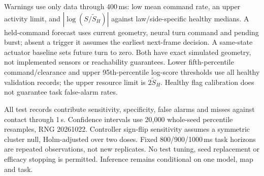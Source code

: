 Warnings use only data through 400\,ms: low mean command rate, an upper activity limit, and $|\log(S/\tilde S_H)|$ against law/side-specific healthy medians. A held-command forecast uses current geometry, neural turn command and pending burst; absent a trigger it assumes the earliest next-frame decision. A same-state actuator baseline sets future turn to zero. Both have exact simulated geometry, not implemented sensors or reachability guarantees. Lower fifth-percentile command/clearance and upper 95th-percentile log-score thresholds use all healthy validation records; the upper resource limit is $2\tilde S_H$. Healthy flag calibration does not guarantee task false-alarm rates.

All test records contribute sensitivity, specificity, false alarms and misses against contact through 1\,s. Confidence intervals use 20,000 whole-seed percentile resamples, RNG 20261022. Controller sign-flip sensitivity assumes a symmetric cluster null, Holm-adjusted over two doses. Fixed 800/900/1000\,ms task horizons are repeated observations, not new replicates. No test tuning, seed replacement or efficacy stopping is permitted. Inference remains conditional on one model, map and task.
